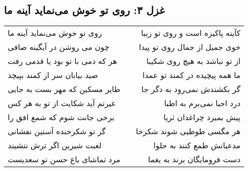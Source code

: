 \begin{center}
\section*{غزل ۳: روی تو خوش می‌نماید آینه ما}
\label{sec:003}
\begin{longtable}{l p{0.5cm} r}
روی تو خوش می‌نماید آینه ما
&&
کآینه پاکیزه است و روی تو زیبا
\\
چون می روشن در آبگینه صافی
&&
خوی جمیل از جمال روی تو پیدا
\\
هر که دمی با تو بود یا قدمی رفت
&&
از تو نباشد به هیچ روی شکیبا
\\
صید بیابان سر از کمند بپیچد
&&
ما همه پیچیده در کمند تو عمدا
\\
طایر مسکین که مهر بست به جایی
&&
گر بکشندش نمی‌رود به دگر جا
\\
غیرتم آید شکایت از تو به هر کس
&&
درد احبا نمی‌برم به اطبا
\\
برخی جانت شوم که شمع افق را
&&
پیش بمیرد چراغدان ثریا
\\
گر تو شکرخنده آستین نفشانی
&&
هر مگسی طوطیی شوند شکرخا
\\
لعبت شیرین اگر ترش ننشیند
&&
مدعیانش طمع کنند به حلوا
\\
مرد تماشای باغ حسن تو سعدیست
&&
دست فرومایگان برند به یغما
\\
\end{longtable}
\end{center}
